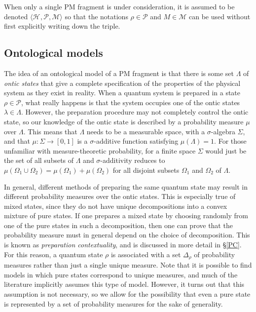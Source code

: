 \documentclass[DIV=calc,paper=a4,fontsize=11pt,twocolumn]{scrartcl} %
\theoremstyle{definition}
\theoremstyle{plain}
\newcommand{\Hilb}[1][]{\ensuremath{\mathcal{H}_{#1}}}
\begin{document}
When only a single PM fragment is under consideration, it is assumed
to be denoted $\langle \Hilb, \mathcal{P}, \mathcal{M} \rangle$ so
that the notations $\rho \in \mathcal{P}$ and $M \in \mathcal{M}$ can
be used without first explicitly writing down the triple.

\subsection{Ontological models}

\label{OM}

The idea of an ontological model of a PM fragment is that there is
some set $\Lambda$ of \emph{ontic states} that give a complete
specification of the properties of the physical system as they exist
in reality.  When a quantum system is prepared in a state $\rho \in
\mathcal{P}$, what really happens is that the system occupies one of
the ontic states $\lambda \in \Lambda$.  However, the preparation
procedure may not completely control the ontic state, so our knowledge
of the ontic state is described by a probability measure $\mu$ over
$\Lambda$.  This means that $\Lambda$ needs to be a measurable space,
with a $\sigma$-algebra $\Sigma$, and that $\mu:\Sigma \rightarrow
[0,1]$ is a $\sigma$-additive function satisfying $\mu(\Lambda) = 1$.
For those unfamiliar with measure-theoretic probability, for a finite
space $\Sigma$ would just be the set of all subsets of $\Lambda$ and
$\sigma$-additivity reduces to $\mu(\Omega_1\cup\Omega_2) =
\mu(\Omega_1) + \mu(\Omega_2)$ for all disjoint subsets $\Omega_1$ and
$\Omega_2$ of $\Lambda$.

In general, different methods of preparing the same quantum state may
result in different probability measures over the ontic states.  This
is especially true of mixed states, since they do not have unique
decompositions into a convex mixture of pure states.  If one prepares
a mixed state by choosing randomly from one of the pure states in such
a decomposition, then one can prove that the probability measure must
in general depend on the choice of decomposition.  This is known as
\emph{preparation contextuality}, and is discussed in more detail in
\S\ref{PC}.  For this reason, a quantum state $\rho$ is associated
with a set $\Delta_{\rho}$ of probability measures rather than just a
single unique measure.  Note that it is possible to find models in
which pure states correspond to unique measures, and much of the
literature implicitly assumes this type of model.  However, it turns
out that this assumption is not necessary, so we allow for the
possibility that even a pure state is represented by a set of
probability measures for the sake of generality.
\end{document}
